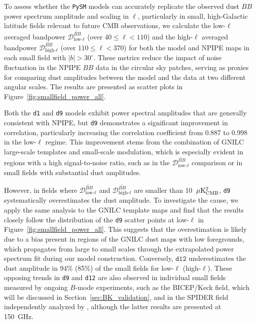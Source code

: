 \documentclass[twocolumn]{aastex631}
\begin{document}
To assess whether the \texttt{PySM} models can accurately replicate the observed dust $BB$ power spectrum amplitude and scaling in $\ell$, particularly in small, high-Galactic latitude fields relevant to future CMB observations, we calculate the low-$\ell$ averaged bandpower $\overline{\mathcal{D}_{\text{low-}\ell}^{BB}}$ (over $40 \le \ell < 110$) and the high-$\ell$ averaged bandpower $\overline{\mathcal{D}_{\text{high-}\ell}^{BB}}$ (over $110 \le \ell < 370$) for both the model and NPIPE maps in each small field with $|b| > 30^\circ$. These metrics reduce the impact of noise fluctuation in the NPIPE $BB$ data in the circular sky patches, serving as proxies for comparing dust amplitudes between the model and the data at two different angular scales. The results are presented as scatter plots in Figure~\ref{fig:smallfield_power_all}.

Both the \texttt{d1} and \texttt{d9} models exhibit power spectral amplitudes that are generally consistent with NPIPE, but \texttt{d9} demonstrates a significant improvement in correlation, particularly increasing the correlation coefficient from 0.887 to 0.998 in the low-$\ell$ regime. This improvement stems from the combination of GNILC large-scale templates and small-scale modulation, which is especially evident in regions with a high signal-to-noise ratio, such as in the $\overline{\mathcal{D}_{\text{low-}\ell}^{BB}}$ comparison or in small fields with substantial dust amplitudes. 

However, in fields where $\overline{\mathcal{D}_{\text{low-}\ell}^{BB}}$ and $\overline{\mathcal{D}_{\text{high-}\ell}^{BB}}$ are smaller than 10~$\mu\rm{K^2_{CMB}}$, \texttt{d9} systematically overestimates the dust amplitude. To investigate the cause, we apply the same analysis to the GNILC template maps and find that the results closely follow the distribution of the \texttt{d9} scatter points at low-$\ell$ in Figure~\ref{fig:smallfield_power_all}. This suggests that the overestimation is likely due to a bias present in regions of the GNILC dust maps with low foregrounds, which propagates from large to small scales through the extrapolated power spectrum fit during our model construction. Conversely, $\texttt{d12}$ underestimates the dust amplitude in 94\% (85\%) of the small fields for low-$\ell$ (high-$\ell$). These opposing trends in \texttt{d9} and \texttt{d12} are also observed in individual small fields measured by ongoing $B$-mode experiments, such as the BICEP/Keck field, which will be discussed in Section~\ref{sec:BK_validation}, and in the SPIDER field independently analyzed by \cite{Ade:2025}, although the latter results are presented at 150~GHz.
\end{document}
